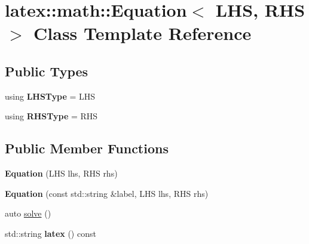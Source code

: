 \hypertarget{classlatex_1_1math_1_1Equation}{\section{latex\-:\-:math\-:\-:Equation$<$ L\-H\-S, R\-H\-S $>$ Class Template Reference}
\label{classlatex_1_1math_1_1Equation}
}
\subsection*{Public Types}
\begin{DoxyCompactItemize}
\item 
\hypertarget{classlatex_1_1math_1_1Equation_aa9edc347823879f6651a4b3dbe31060f}{using {\bfseries L\-H\-S\-Type} = L\-H\-S}\label{classlatex_1_1math_1_1Equation_aa9edc347823879f6651a4b3dbe31060f}

\item 
\hypertarget{classlatex_1_1math_1_1Equation_a70e604aaab38b87af4df46932fab25cc}{using {\bfseries R\-H\-S\-Type} = R\-H\-S}\label{classlatex_1_1math_1_1Equation_a70e604aaab38b87af4df46932fab25cc}

\end{DoxyCompactItemize}
\subsection*{Public Member Functions}
\begin{DoxyCompactItemize}
\item 
\hypertarget{classlatex_1_1math_1_1Equation_abf2df112f6302c99b56fa31927142d33}{{\bfseries Equation} (L\-H\-S lhs, R\-H\-S rhs)}\label{classlatex_1_1math_1_1Equation_abf2df112f6302c99b56fa31927142d33}

\item 
\hypertarget{classlatex_1_1math_1_1Equation_a354a3d509dd259c1c0b51ab915867169}{{\bfseries Equation} (const std\-::string \&label, L\-H\-S lhs, R\-H\-S rhs)}\label{classlatex_1_1math_1_1Equation_a354a3d509dd259c1c0b51ab915867169}

\item 
auto \hyperlink{classlatex_1_1math_1_1Equation_a07edd6119b4c578f0bd109501284120b}{solve} ()
\item 
\hypertarget{classlatex_1_1math_1_1Equation_acc052b3d3d93f32438ada7338b641d6e}{std\-::string {\bfseries latex} () const }\label{classlatex_1_1math_1_1Equation_acc052b3d3d93f32438ada7338b641d6e}

\end{DoxyCompactItemize}
